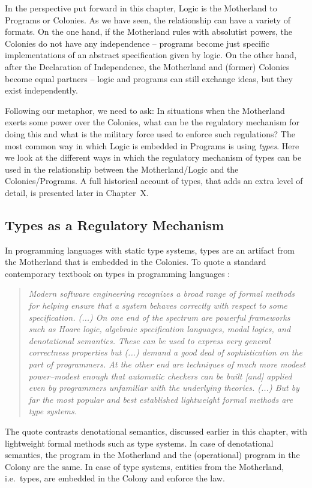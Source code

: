 \documentclass[]{article}
\begin{document}
In the perspective put forward in this chapter, Logic is the Motherland to Programs or Colonies. As we have seen, the relationship can have a variety of formats. On the one hand, if the Motherland rules with absolutist powers, the Colonies do not have any independence -- programs become just specific implementations of an abstract specification given by logic. On the other hand, after the Declaration of Independence, the Motherland and (former) Colonies become equal partners -- logic and programs can still exchange ideas, but they exist independently.

Following our metaphor, we need to ask: In situations when the Motherland exerts some power over the Colonies, what can be the regulatory mechanism for doing this and what is the military force used to enforce such regulations? The most common way in which Logic is embedded in Programs is using \emph{types}. Here we look at the different ways in which the regulatory mechanism of types can be used in the relationship between the Motherland/Logic and the Colonies/Programs. A full historical account of types, that adds an extra level of detail, is presented later in Chapter~X.

\subsection{Types as a Regulatory Mechanism}
In programming languages with static type systems, types are an artifact from the Motherland that is embedded in the Colonies. To quote a standard contemporary textbook on types in programming languages \cite{pierce2002types}:

\begin{quotation}
\emph{Modern software engineering recognizes a broad range of formal methods for helping ensure that a system behaves correctly with respect to some specification. (...) On one end of the spectrum are powerful frameworks such as Hoare logic, algebraic specification languages, modal logics, and denotational semantics. These can be used to express very general correctness properties but (...) demand a good deal of sophistication on the part of programmers. At the other end are techniques of much more modest power--modest enough that automatic checkers can be built [and] applied even by programmers unfamiliar with the underlying theories. (...) But by far the most popular and best established lightweight formal methods are type systems.}
\end{quotation}

The quote contrasts denotational semantics, discussed earlier in this chapter, with lightweight  formal methods such as type systems. In case of denotational semantics, the program in the Motherland and the (operational) program in the Colony are the same. In case of type systems, entities from the Motherland, i.e.~types, are embedded in the Colony and enforce the law.
\end{document}
